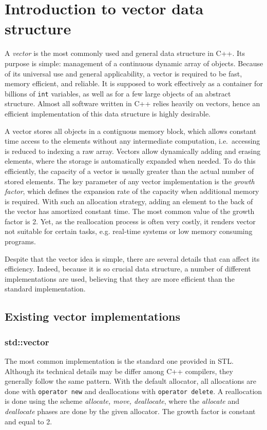 \documentclass[inz, english, shortabstract]{iithesis}
\begin{document}

\chapter{Introduction to vector data structure}

A \emph{vector} is the most commonly used and general data structure in C++. Its purpose is simple: management of a continuous dynamic array of objects. Because of its universal use and general applicability, a vector is required to be fast, memory efficient, and reliable. It is supposed to work effectively as a container for billions of {\tt int} variables, as well as for a few large objects of an abstract structure. Almost all software written in C++ relies heavily on vectors, hence an efficient implementation of this data structure is highly desirable.

A vector stores all objects in a contiguous memory block, which allows constant time access to the elements without any intermediate computation, i.e.\ accessing is reduced to indexing a raw array. Vectors allow dynamically adding and erasing elements, where the storage is automatically expanded when needed. To do this efficiently, the capacity of a vector is usually greater than the actual number of stored elements. The key parameter of any vector implementation is the \emph{growth factor}, which defines the expansion rate of the capacity when additional memory is required. With such an allocation strategy, adding an element to the back of the vector has amortized constant time. The most common value of the growth factor is 2. Yet, as the reallocation process is often very costly, it renders vector not suitable for certain tasks, e.g. real-time systems or low memory consuming programs.

Despite that the vector idea is simple, there are several details that can affect its efficiency.
Indeed, because it is so crucial data structure, a number of different implementations are used, believing that they are more efficient than the standard implementation.

\section{Existing vector implementations}

\subsection{std::vector}
The most common implementation is the standard one provided in STL.
Although its technical details may be differ among C++ compilers, they generally follow the same pattern.
With the default allocator, all allocations are done with {\tt operator new} and deallocations with {\tt operator delete}. A reallocation is done using the scheme \emph{allocate, move, deallocate}, where the \emph{allocate} and \emph{deallocate} phases are done by the given allocator. The growth factor is constant and equal to 2.
\end{document}
